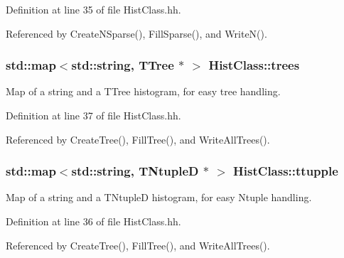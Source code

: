 Definition at line 35 of file Hist\-Class.\-hh.



Referenced by Create\-N\-Sparse(), Fill\-Sparse(), and Write\-N().

\subsubsection[{trees}]{\setlength{\rightskip}{0pt plus 5cm}std\-::map$<$std\-::string, T\-Tree $\ast$ $>$ Hist\-Class\-::trees\hspace{0.3cm}{\ttfamily [static]}}\label{namespaceHistClass_ae4231d725185c3df09776135acb36fce}
Map of a string and a T\-Tree histogram, for easy tree handling. 

Definition at line 37 of file Hist\-Class.\-hh.



Referenced by Create\-Tree(), Fill\-Tree(), and Write\-All\-Trees().

\subsubsection[{ttupple}]{\setlength{\rightskip}{0pt plus 5cm}std\-::map$<$std\-::string, T\-Ntuple\-D $\ast$ $>$ Hist\-Class\-::ttupple\hspace{0.3cm}{\ttfamily [static]}}\label{namespaceHistClass_ad55b28aa4052eaf0b5e9bbeba8575f02}
Map of a string and a T\-Ntuple\-D histogram, for easy Ntuple handling. 

Definition at line 36 of file Hist\-Class.\-hh.



Referenced by Create\-Tree(), Fill\-Tree(), and Write\-All\-Trees().


